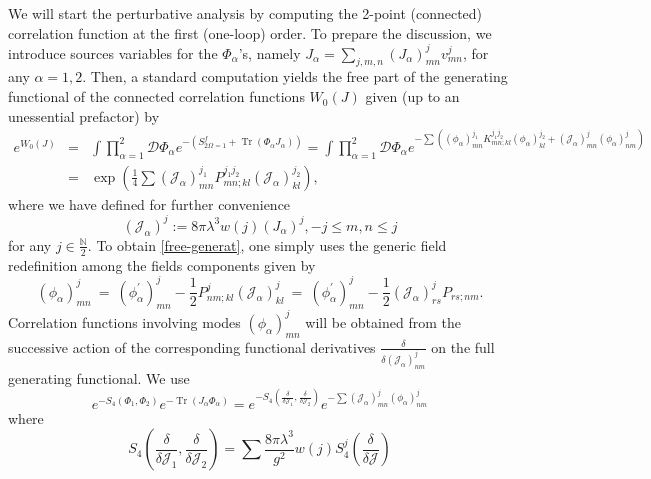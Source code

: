 \documentclass[a4paper,11pt,twoside]{article}
\numberwithin{equation}{section}
\DeclareMathOperator{\tr}{Tr}
\theoremstyle{nonumberplain}
\newcounter{and}
\begin{document}
We will start the perturbative analysis by computing the 2-point (connected) correlation function at the first (one-loop) order. To prepare the discussion, we introduce sources variables for the $\Phi_\alpha$'s, namely $J_\alpha = \underset{j,m,n}{\sum}(J_\alpha)^j_{mn}v^j_{mn}$, for any $\alpha=1,2$. Then, a standard computation yields the free part of the generating functional of the connected correlation functions $W_0(J)$ given (up to an unessential prefactor) by%
%
\begin{eqnarray}
e^{W_0(J)}&=& \int\prod_{\alpha=1}^2\mathcal{D}\Phi_\alpha e^{-(S^f_{2\Omega=1}+\tr(\Phi_\alpha J_\alpha))}
=\int\prod_{\alpha=1}^2\mathcal{D}\Phi_\alpha e^{-\sum((\phi_\alpha)^{j_1}_{mn}K^{j_1j_2}_{mn;kl}(\phi_\alpha)^{j_2}_{kl}+(\mathcal{J}_\alpha)^j_{mn}(\phi_\alpha)^{j}_{nm})}\nonumber\\
&=&\exp(\frac{1}{4}\sum(\mathcal{J}_\alpha)^{j_1}_{mn}P^{j_1j_2}_{mn;kl}(\mathcal{J}_\alpha)^{j_2}_{kl})\label{free-generat},
\end{eqnarray}
%
where we have defined for further convenience
\begin{equation}
(\mathcal{J}_\alpha)^{j}:=8\pi\lambda^3w(j)({J}_\alpha)^{j}, -j\le m,n\le j\label{source}
\end{equation}
for any $j\in\frac{\mathbb{N}}{2}$. To obtain \eqref{free-generat}, one simply uses the generic field redefinition among the fields components given by%
%
\begin{equation*}
(\phi_\alpha)^j_{mn} \ = \ (\phi^\prime_\alpha)_{mn}^j - \frac12 {P}^j_{nm;kl} (\mathcal{J}_\alpha)^j_{kl} \ = \ (\phi^\prime_\alpha)_{mn}^j - \frac12 (\mathcal{J}_\alpha)^j_{rs}{P}_{rs;nm}. 
\end{equation*}
%
Correlation functions involving modes $(\phi_\alpha)^j_{mn}$ will be obtained from the successive action of the corresponding functional derivatives $\frac{\delta}{\delta(\mathcal{J}_\alpha)^j_{nm}}$ on the full generating functional. We use
\begin{equation}
e^{-S_4(\Phi_1,\Phi_2)}e^{-\tr(J_\alpha\Phi_\alpha)}=e^{-S_4(\frac{\delta}{\delta\mathcal{J}_1},\frac{\delta}{\delta\mathcal{J}_2})}e^{-\sum(\mathcal{J}_\alpha)^j_{mn}(\phi_\alpha)^{j}_{nm}}\label{trick}
\end{equation}
where
\begin{equation}
S_4(\frac{\delta}{\delta\mathcal{J}_1},\frac{\delta}{\delta\mathcal{J}_2})=\sum\frac{8\pi\lambda^3}{g^2}w(j)S^j_4(\frac{\delta}{\delta\mathcal{J}})\label{s4intfunction}
\end{equation}
\end{document}
